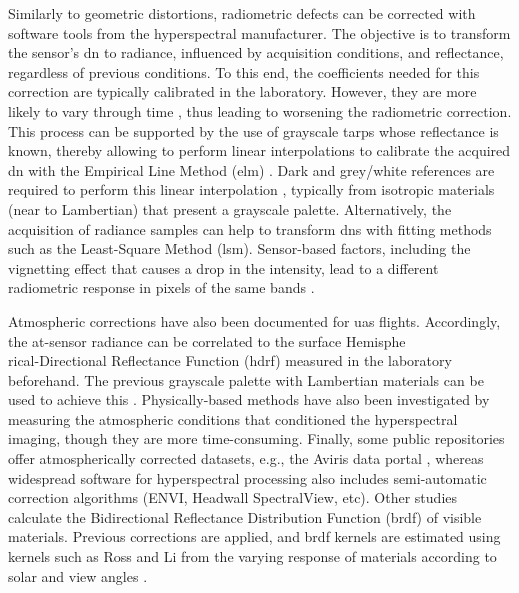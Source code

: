 Similarly to geometric distortions, radiometric defects can be corrected with software tools from the hyperspectral manufacturer. The objective is to transform the sensor's \acrshort{dn} to radiance, influenced by acquisition conditions, and reflectance, regardless of previous conditions. To this end, the coefficients needed for this correction are typically calibrated in the laboratory. However, they are more likely to vary through time \cite{adao_hyperspectral_2017}, thus leading to worsening the radiometric correction. This process can be supported by the use of grayscale tarps whose reflectance is known, thereby allowing to perform linear interpolations to calibrate the acquired \acrshort{dn} \cite{lucieer_hyperuasimaging_2014} with the Empirical Line Method (\acrshort{elm}) \cite{aasen_quantitative_2018, sousa_uav-based_2022}. Dark and grey/white references are required to perform this linear interpolation \cite{jakob_need_2017, sagan_data-driven_2022, duan_land_2013}, typically from isotropic materials (near to Lambertian) that present a grayscale palette. Alternatively, the acquisition of radiance samples can help to transform \acrshort{dn}s with fitting methods such as the Least-Square Method (\acrshort{lsm}). Sensor-based factors, including the vignetting effect that causes a drop in the intensity, lead to a different radiometric response in pixels of the same bands \cite{yang_dom_2017}.

Atmospheric corrections have also been documented for \acrshort{uas} flights. Accordingly, the at-sensor radiance can be correlated to the surface Hemisphe\\rical-Directional Reflectance Function (\acrshort{hdrf}) measured in the laboratory beforehand. The previous grayscale palette with Lambertian materials can be used to achieve this \cite{lucieer_hyperuasimaging_2014}. Physically-based methods have also been investigated by measuring the atmospheric conditions that conditioned the hyperspectral imaging, though they are more time-consuming. Finally, some public repositories offer atmospherically corrected datasets, e.g., the Aviris data portal \cite{california_institute_of_technology_aviris_nodate}, whereas widespread software for hyperspectral processing also includes semi-automatic correction algorithms (ENVI, Headwall SpectralView, etc). Other studies calculate the Bidirectional Reflectance Distribution Function (\acrshort{brdf}) of visible materials. Previous corrections are applied, and \acrshort{brdf} kernels are estimated using kernels such as Ross and Li from the varying response of materials according to solar and view angles \cite{queally_flexbrdf_2022, jia_kernel-driven_2020, sagan_data-driven_2022}.

